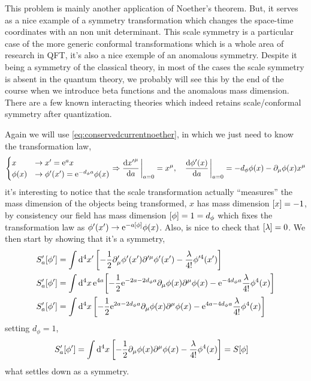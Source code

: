\problem{}

This problem is mainly another application of Noether's theorem. But, it serves as a nice example of a symmetry transformation 
which changes the space-time coordinates with an non unit determinant. This scale symmetry is a particular case of the more 
generic conformal transformations which is a whole area of research in QFT, it's also a nice exemple of an anomalous symmetry. 
Despite it being a symmetry of the classical theory, in most of the cases the scale symmetry is absent in the quantum theory, 
we probably will see this by the end of the course when we introduce beta functions and the anomalous mass dimension. There are a 
few known interacting theories which indeed retains scale/conformal symmetry after quantization. 

Again we will use \cref{eq:conservedcurrentnoether}, in which we just need to know the transformation law,
\begin{align}
    \begin{cases}
        x&\rightarrow x' = \e^a x\\
        \phi\qty(x)&\rightarrow \phi'\qty(x')=\e^{-d_\phi a}\phi\qty(x)
    \end{cases}\Rightarrow \dv{{x'}^\mu}{a}\eval_{a=0} = x^\mu,\ \ \ \dv{\phi'\qty(x)}{a}\eval_{a=0}=-d_\phi\phi\qty(x) -\partial_\mu\phi\qty(x)x^\mu
\end{align}
it's interesting to notice that the scale transformation actually ``measures'' the mass dimension of the objects being transformed, $x$ has 
mass dimension $\qty[x]=-1$, by consistency our field has mass dimension $\qty[\phi]=1=d_\phi$ which fixes the transformation law as $\phi'(x')\rightarrow \textnormal{e}^{-a\qty[\phi]}\phi\qty(x)$. 
Also, is nice to check that $\qty[\lambda]=0$. We then start by showing that it's a symmetry,
\begin{align}
    S'_a\qty[\phi']&= \int\dd[4]{x'}\qty[-\frac12\partial'_\mu\phi'\qty(x')\partial'^\mu\phi'\qty(x')-\frac{\lambda}{4!}\phi'^4\qty(x')]\\
    S'_a\qty[\phi']&= \int\dd[4]{x}\textnormal{e}^{4a}\qty[-\frac12\textnormal{e}^{-2a-2d_\phi a}\partial_\mu\phi\qty(x)\partial^\mu\phi\qty(x)-\textnormal{e}^{-4d_\phi a}\frac{\lambda}{4!}\phi^4\qty(x)]\\
    S'_a\qty[\phi']&= \int\dd[4]{x}\qty[-\frac12\textnormal{e}^{2a-2d_\phi a}\partial_\mu\phi\qty(x)\partial^\mu\phi\qty(x)-\textnormal{e}^{4a-4d_\phi a}\frac{\lambda}{4!}\phi^4\qty(x)]
\end{align}
setting $d_\phi=1$,
\begin{align}
    S'_a\qty[\phi']&= \int\dd[4]{x}\qty[-\frac12\partial_\mu\phi\qty(x)\partial^\mu\phi\qty(x)-\frac{\lambda}{4!}\phi^4\qty(x)]=S[\phi]
\end{align}
what settles down as a symmetry.

